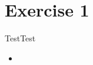 
\section{Exercise 1}

\begin{frame}[fragile]{Test}{Test}
  \begin{itemize}
    \item {}
  \end{itemize}
\end{frame}
